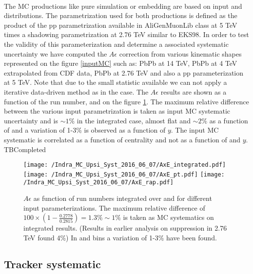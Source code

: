 \paragraph{}
The MC productions like pure simulation or embedding are based on input \pt and \y distributions.
The parametrization used for both productions is defined as the product of the pp parametrization available in AliGenMuonLib class at 5 TeV times a shadowing parametrization at 2.76 TeV similar to EKS98.
In order to test the validity of this parameterization and determine a associated systematic uncertainty we have computed the \ups $A\epsilon$ correction from various kinematic shapes represented on the figure \ref{inputMC} such as: PbPb at 14 TeV, PbPb at 4 TeV extrapolated from CDF data, PbPb at 2.76 TeV and also a pp parameterization at 5 TeV.
Note that due to the small statistic available we can not apply a iterative data-driven method as in the \jpsi case.
The $A\epsilon$ results are shown as a function of the run number, \pt and \y on the figure \ref{sysinputMC}.
The maximum relative difference between the various input parametrization is taken as input MC systematic uncertainty and is $\sim1\%$ in the integrated case, almost flat and $\sim2\%$ as a function of \pt and a variation of 1-3\% is observed as a function of $y$.
The input MC systematic is correlated as a function of centrality and not as a function of \pt and $y$.
TBCompleted

\begin{figure}[!h]
\begin{center}
  \texttt{[image: /Indra\_MC\_Upsi\_Syst\_2016\_06\_07/AxE\_integrated.pdf]}
  \texttt{[image: /Indra\_MC\_Upsi\_Syst\_2016\_06\_07/AxE\_pt.pdf]}
  \texttt{[image: /Indra\_MC\_Upsi\_Syst\_2016\_06\_07/AxE\_rap.pdf]}
   \end{center} 
\caption{\label{sysinputMC} $A\epsilon$ as function of run numbers integrated over \pt and \y for different input parameterizations. The maximum relative difference of $100 \times(1-\frac{0.2778}{0.2815}) = 1.3 \% \sim 1\%$ is taken as MC systematics on integrated results.  (Results in earlier analysis on \upsi suppression in 2.76 TeV found 4\%)
In \pt and \y bins a variation of 1-3\% have been found. }
\end{figure}       





\subsection{Tracker systematic}

